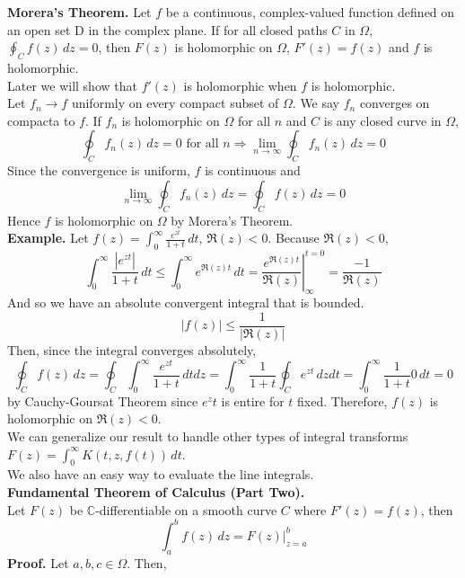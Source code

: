 \documentclass[11pt]{article}
\newcommand*\Eval[3]{\left.#1\right\rvert_{#2}^{#3}}
\begin{document}
\newline
\textbf{Morera's Theorem.} Let $f$ be a continuous, complex-valued function defined on an open set D in the complex plane. If for all closed paths $C$ in $\Omega$, $\oint_C f(z) \,dz = 0$, then $F(z)$ is holomorphic on $\Omega$, $F'(z) = f(z)$ and $f$ is holomorphic. \\
Later we will show that $f'(z)$ is holomorphic when $f$ is holomorphic. \\
\newline
Let $f_n \to f$ uniformly on every compact subset of $\Omega$. We say $f_n$ converges on compacta to $f$. If $f_n$ is holomorphic on $\Omega$ for all $n$ and $C$ is any closed curve in $\Omega$, 
$$\oint_C f_n(z) \,dz = 0 \mbox{ for all } n \Longrightarrow \lim_{n\to \infty}{\oint_Cf_n(z) \, dz} = 0$$
Since the convergence is uniform, $f$ is continuous and 
$$ \lim_{n\to \infty}{\oint_C f_n(z) \,dz} = \oint_C f(z) \, dz = 0$$
Hence $f$ is holomorphic on $\Omega$ by Morera's Theorem. \\
\newline 
\textbf{Example.} Let $f(z) = \int_0^{\infty} \frac{e^{zt}}{1 + t} \, dt$, $\Re(z) < 0$. Because $\Re(z) < 0$, 
$$\int_0^{\infty} \frac{|e^{zt}|}{1 + t} \,dt \leqslant \int_0^{\infty} e^{\Re(z)t} \,dt = \Eval{\frac{e^{\Re(z)t}}{\Re(z)}}{\infty}{t = 0} = \frac{-1}{\Re(z)}$$
And so we have an absolute convergent integral that is bounded. 
$$|f(z)| \leqslant \frac{1}{|\Re(z)|}$$
Then, since the integral converges absolutely,
$$\oint_C f(z) \,dz = \oint_C \int_0^{\infty} \frac{e^{zt}}{1 + t}\,dtdz = \int_0^{\infty} \frac{1}{1+t} \oint_C e^{zt} \,dzdt = \int_0^{\infty} \frac{1}{1+t}0 \,dt = 0$$
by Cauchy-Goursat Theorem since $e^zt$ is entire for $t$ fixed. Therefore, $f(z)$ is holomorphic on $\Re(z) < 0$. \\
We can generalize our result to handle other types of integral transforms $F(z) = \int_0^{\infty} K(t, z, f(t)) \,dt$. \\
We also have an easy way to evaluate the line integrals. \\
\newline
\textbf{Fundamental Theorem of Calculus (Part Two).} \\
Let $F(z)$ be $\mathbb{C}$-differentiable on a smooth curve $C$ where $F'(z) = f(z)$, then
$$\int_a^b f(z) \,dz = F(z)\Big|_{z = a}^{b}$$
\textbf{Proof.} Let $a, b, c \in \Omega$. Then, 
\end{document}
